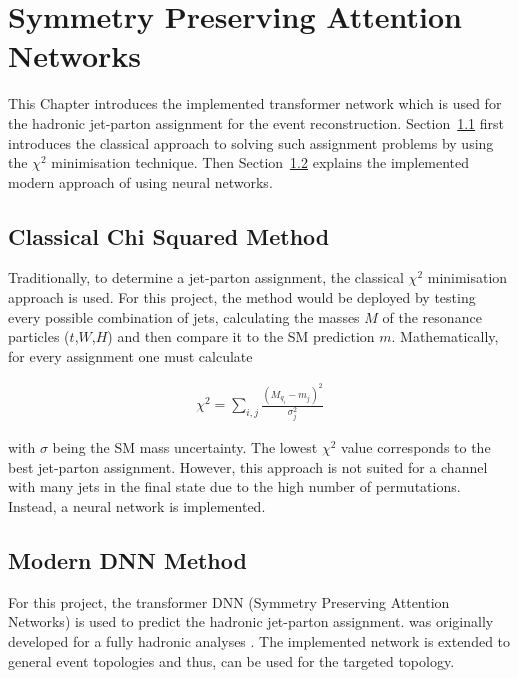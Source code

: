 \documentclass[bachelor,ngerman,english]{GAUBM}
\begin{document}

\chapter{Symmetry Preserving Attention Networks}
\label{ch:spanet}
This Chapter introduces the implemented transformer network \spanet \cite{spanet_01,spanet_02} which is used for the hadronic jet-parton assignment for the event reconstruction. Section~\ref{sec:spanet:chi_squared} first introduces the classical approach to solving such assignment problems by using the $\chi^2$ minimisation technique. Then Section~\ref{sec:spanet:modern} explains the implemented modern approach of using neural networks.


\section{Classical Chi Squared Method}
\label{sec:spanet:chi_squared}
Traditionally, to determine a jet-parton assignment, the classical $\chi^2$ minimisation approach \cite{nn:chi_squared} is used. For this project, the method would be deployed by testing every possible combination of jets, calculating the masses $M$ of the resonance particles ($t$,$W$,$H$) and then compare it to the SM prediction $m$. Mathematically, for every assignment one must calculate

\begin{align*}
    \chi^2 = \sum_{i,j} \frac{(M_{q_i}-m_j)^2}{\sigma_j^2}
\end{align*}

with $\sigma$ being the SM mass uncertainty. The lowest $\chi^2$ value corresponds to the best jet-parton assignment. However, this approach is not suited for a channel with many jets in the final state due to the high number of permutations. Instead, a neural network is implemented.


\section{Modern DNN Method}
\label{sec:spanet:modern}
For this project, the transformer DNN \spanet (Symmetry Preserving Attention Networks) \cite{spanet_01,spanet_02} is used to predict the hadronic jet-parton assignment. \spanet was originally developed for a fully hadronic \ttbar analyses \cite{spanet_03}. The implemented network is extended to general event topologies \cite{spanet_01} and thus, can be used for the targeted \ttHWW topology.
\end{document}
